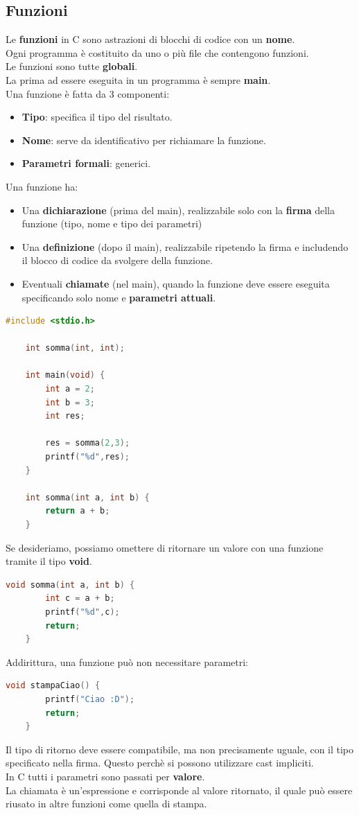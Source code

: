 \documentclass[12pt,a4paper]{article}
\begin{document}
\subsection{Funzioni}
Le \textbf{funzioni} in C sono astrazioni di blocchi di codice con un \textbf{nome}.\\
Ogni programma è costituito da uno o più file che contengono funzioni.\\
Le funzioni sono tutte \textbf{globali}.\\
La prima ad essere eseguita in un programma è sempre \textbf{main}.\\
Una funzione è fatta da 3 componenti:
\begin{itemize}
    \item \textbf{Tipo}: specifica il tipo del risultato.
    \item \textbf{Nome}: serve da identificativo per richiamare la funzione.
    \item \textbf{Parametri formali}: generici.
\end{itemize}
Una funzione ha:
\begin{itemize}
    \item Una \textbf{dichiarazione} (prima del main), realizzabile solo con la \textbf{firma} della funzione (tipo, nome e tipo dei parametri)
    \item Una \textbf{definizione} (dopo il main), realizzabile ripetendo la firma e includendo il blocco di codice da svolgere della funzione.
    \item Eventuali \textbf{chiamate} (nel main), quando la funzione deve essere eseguita specificando solo nome e \textbf{parametri attuali}.
\end{itemize}
\begin{lstlisting}[language=C]
    #include <stdio.h>

    int somma(int, int);

    int main(void) {
        int a = 2;
        int b = 3;
        int res;

        res = somma(2,3);
        printf("%d",res);
    }

    int somma(int a, int b) {
        return a + b;
    }
\end{lstlisting}
Se desideriamo, possiamo omettere di ritornare un valore con una funzione tramite il tipo \textbf{void}.
\begin{lstlisting}[language=C]
    void somma(int a, int b) {
        int c = a + b;
        printf("%d",c);
        return;
    }
\end{lstlisting}
Addirittura, una funzione può non necessitare parametri:
\begin{lstlisting}[language=C]
    void stampaCiao() {
        printf("Ciao :D");
        return;
    }
\end{lstlisting}
Il tipo di ritorno deve essere compatibile, ma non precisamente uguale, con il tipo specificato nella firma. Questo perchè si possono utilizzare cast impliciti.\\
In C tutti i parametri sono passati per \textbf{valore}.\\
La chiamata è un'espressione e corrisponde al valore ritornato, il quale può essere riusato in altre funzioni come quella di stampa.
\end{document}
